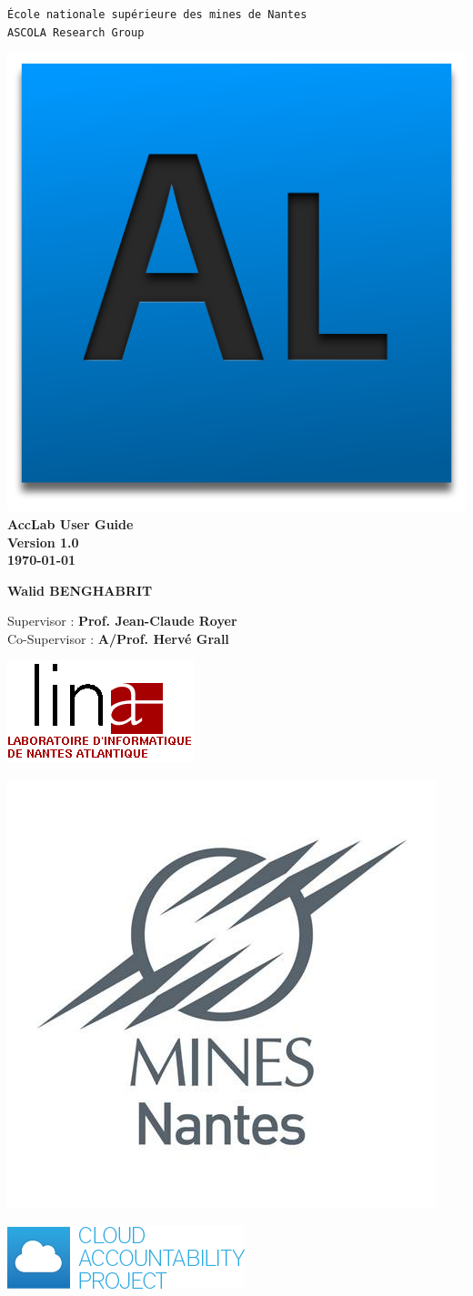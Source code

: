 \begin{titlepage}

\thispagestyle{empty}

\begin{center}
	\large{\texttt{École nationale supérieure des mines de Nantes}}\\
	\large{\texttt{ASCOLA Research Group}}
\end{center}

\noindent
\vspace{0.5cm}

\begin{center}
	\includegraphics[height=14ex,keepaspectratio,angle=20]{assets/acclab.png}
	\Huge{\textbf{AccLab User Guide}} \\ \vspace{0.5cm} \large{\textbf{Version 1.0}} \\
	\vspace{0.4cm}
	\large{\textbf{\today}}
	\normalsize
	\vspace{4.0cm}

	\begin{center}
	  \textbf{Walid BENGHABRIT}
	\end{center}

	\vspace{2mm}
	Supervisor : \textbf{Prof. Jean-Claude Royer} \\
	Co-Supervisor : \textbf{A/Prof. Hervé Grall}

\end{center}

\vspace{4.5cm}
\parbox{0.33\linewidth}{ \includegraphics[height=9ex,keepaspectratio]{assets/lina_logo.png}}
\parbox{0.33\linewidth}{ \includegraphics[height=15.7ex,keepaspectratio]{assets/enmLogo.jpg}}
\parbox{0.33\linewidth}{ \includegraphics[height=7.0ex,keepaspectratio]{assets/a4cloud.png}}

\end{titlepage}